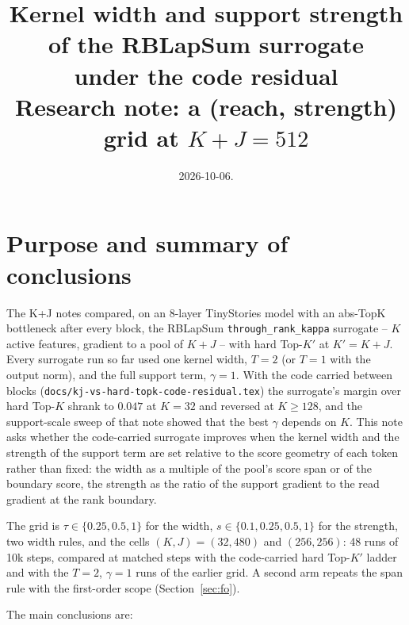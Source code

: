 \documentclass[11pt,a4paper]{article}
\title{Kernel width and support strength of the RBLapSum surrogate\\
under the code residual\\[2pt]
\large Research note: a (reach, strength) grid at $K+J = 512$}
\author{}
\date{2026-10-06.}
\newcommand{\code}[1]{\texttt{#1}}
\newcommand{\Kp}{K'}
\begin{document}
\maketitle
\vspace{-2em}

\section{Purpose and summary of conclusions}

The K+J notes compared, on an 8-layer TinyStories model with an abs-TopK
bottleneck after every block, the RBLapSum \code{through\_rank\_kappa}
surrogate -- $K$ active features, gradient to a pool of $K+J$ -- with hard
Top-$\Kp$ at $\Kp = K+J$. Every surrogate run so far used one kernel width,
$T = 2$ (or $T = 1$ with the output norm), and the full support term,
$\gamma = 1$. With the code carried between blocks
(\code{docs/kj-vs-hard-topk-code-residual.tex}) the surrogate's margin over
hard Top-$K$ shrank to $0.047$ at $K = 32$ and reversed at $K \ge 128$, and
the support-scale sweep of that note showed that the best $\gamma$ depends on
$K$. This note asks whether the code-carried surrogate improves when the
kernel width and the strength of the support term are set relative to the
score geometry of each token rather than fixed: the width as a multiple of
the pool's score span or of the boundary score, the strength as the ratio of
the support gradient to the read gradient at the rank boundary.

The grid is $\tau \in \{0.25, 0.5, 1\}$ for the width, $s \in \{0.1, 0.25,
0.5, 1\}$ for the strength, two width rules, and the cells $(K, J) = (32,
480)$ and $(256, 256)$: 48 runs of 10k steps, compared at matched steps with
the code-carried hard Top-$\Kp$ ladder and with the $T = 2$, $\gamma = 1$
runs of the earlier grid. A second arm repeats the span rule with the
first-order scope (Section~\ref{sec:fo}).

The main conclusions are:
\end{document}
